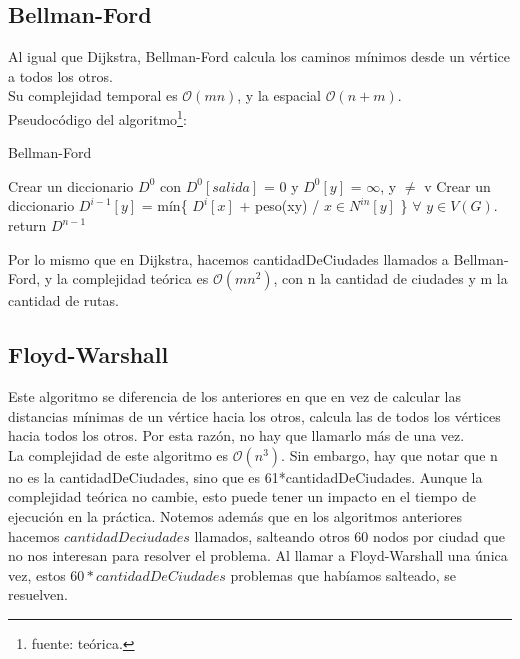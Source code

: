 \subsection{Bellman-Ford}
Al igual que Dijkstra, Bellman-Ford calcula los caminos mínimos desde un vértice a todos los otros.\\
\indent Su complejidad temporal es $\mathcal{O}(mn)$, y la espacial $\mathcal{O}(n+m)$. \\
\indent Pseudocódigo del algoritmo\footnote{fuente: teórica.}:

\begin{algorithm}[H]
\caption{Bellman-Ford}
\label{$BF$}
\begin{algorithmic}[1]
\State Crear un diccionario $D^{0}$ con $D^{0}[salida]$ = 0 y $D^{0}[y]$ = $\infty$, y $\neq$ v
\State Crear un diccionario $D^{i-1}[y]$ = mín\{ $D^{i}[x]$ + peso(xy) / $x \in N^{in}[y]$ \} $\forall$ $y \in V(G)$.
\EndFor
\State return $D^{n-1}$
\EndProcedure
\end{algorithmic}
\end{algorithm}

\indent Por lo mismo que en Dijkstra, hacemos cantidadDeCiudades llamados a Bellman-Ford, y la complejidad teórica es $\mathcal{O}(mn^{2})$, con n la cantidad de ciudades y m la cantidad de rutas.

\subsection{Floyd-Warshall}
Este algoritmo se diferencia de los anteriores en que en vez de calcular las distancias mínimas de un vértice hacia los otros, calcula las de todos los vértices hacia todos los otros. Por esta razón, no hay que llamarlo más de una vez.\\
\indent La complejidad de este algoritmo es $\mathcal{O}(n^3)$. Sin embargo, hay que notar que n no es la cantidadDeCiudades, sino que es 61*cantidadDeCiudades. Aunque la complejidad teórica no cambie, esto puede tener un impacto en el tiempo de ejecución en la práctica. Notemos además que en los algoritmos anteriores hacemos $cantidadDeciudades$ llamados, salteando otros 60 nodos por ciudad que no nos interesan para resolver el problema. Al llamar a Floyd-Warshall una única vez, estos $60*cantidadDeCiudades$ problemas que habíamos salteado, se resuelven.

